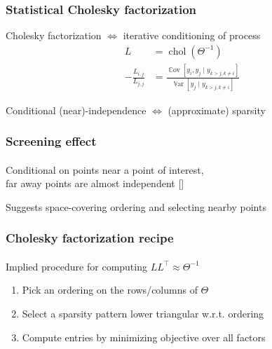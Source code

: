 \documentclass{beamer}                             %
\newcommand*{\CM}{\Theta}
\DeclareMathOperator{\chol}{chol}
\DeclareMathOperator{\Var}{\mathbb{V}ar}
\DeclareMathOperator{\Cov}{\mathbb{C}ov}
\newenvironment{wideitemize}
  {\itemize\setlength{\itemsep}{0.5cm}}
  {\enditemize}
\begin{document}
\begin{frame}
\frametitle{Statistical Cholesky factorization}

\begin{wideitemize}
  \item<+-> Cholesky factorization \( \Leftrightarrow
    \) iterative conditioning of process
    \begin{align*}
      L &= \chol(\CM^{-1}) \\
      -\frac{L_{i, j}}{L_{j, j}} &=
        \frac{\Cov[y_i, y_j \mid y_{k > j, k \neq i}]}
             {\Var[y_j      \mid y_{k > j, k \neq i}]}
    \end{align*}
  \item<+-> Conditional (near)-independence \(
    \Leftrightarrow \) (approximate) sparsity
\end{wideitemize}
\end{frame}

\begin{frame}
\frametitle{Screening effect}
\framesubtitle{}

\begin{figure}[t]
  \centering
  \qquad
  
\end{figure}

\begin{wideitemize}
  \item<+-> Conditional on points near a point of interest, \\
    far away points are almost independent [\cite{stein2002screening}]
  \item<+-> Suggests space-covering ordering
    and selecting nearby points %
\end{wideitemize}
\end{frame}

\begin{frame}
\frametitle{Cholesky factorization recipe}
\framesubtitle{}

\begin{wideitemize}
  \item<+-> Implied procedure for computing \( L L^{\top} \approx \CM^{-1} \)
    \begin{enumerate}
      \item Pick an ordering on the rows/columns of \( \CM \)
      \item Select a sparsity pattern lower triangular w.r.t. ordering
      \item Compute entries by minimizing objective over all factors
    \end{enumerate}
\end{wideitemize}
\end{frame}
\end{document}
